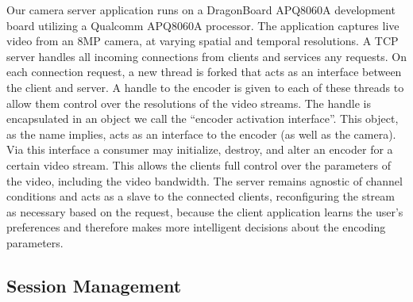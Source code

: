 Our camera server application runs on a DragonBoard APQ8060A development board utilizing a Qualcomm APQ8060A processor. The application captures live video from an 8MP camera, at varying spatial and temporal resolutions. A TCP server handles all incoming connections from clients and services any requests. On each connection request, a new thread is forked that acts as an interface between the client and server. A handle to the encoder is given to each of these threads to allow them control over the resolutions of the video streams. The handle is encapsulated in an object we call the ``encoder activation interface''. This object, as the name implies, acts as an interface to the encoder (as well as the camera). Via this interface a consumer may initialize, destroy, and alter an encoder for a certain video stream. This allows the clients full control over the parameters of the video, including the video bandwidth. The server remains agnostic of channel conditions and acts as a slave to the connected clients, reconfiguring the stream as necessary based on the request, because the client application learns the user’s preferences and therefore makes more intelligent decisions about the encoding parameters.

\subsection{Session Management}


